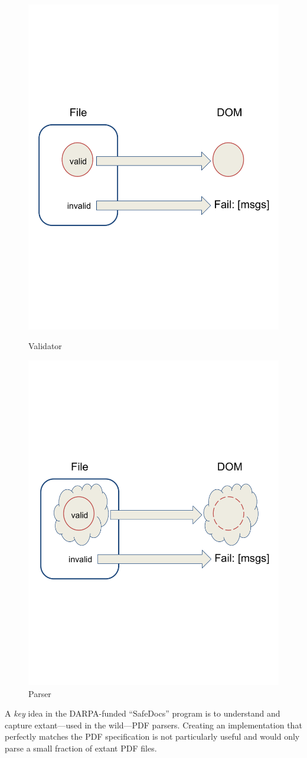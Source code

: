 \begin{figure}[t]
    \centering
    \includegraphics[width=0.50\linewidth]{figures/validator.pdf}
    \caption{Validator}
    \label{fig:validator}
    
    \includegraphics[width=0.50\linewidth]{figures/parser.pdf}
    \caption{Parser}
    \label{fig:parser}
\end{figure}

A \emph{key} idea in the DARPA-funded ``SafeDocs'' program is to
understand and
capture extant---used in the wild---PDF parsers.  Creating an implementation
that perfectly matches the PDF specification is not particularly useful
and would only parse a small fraction of extant PDF files.


